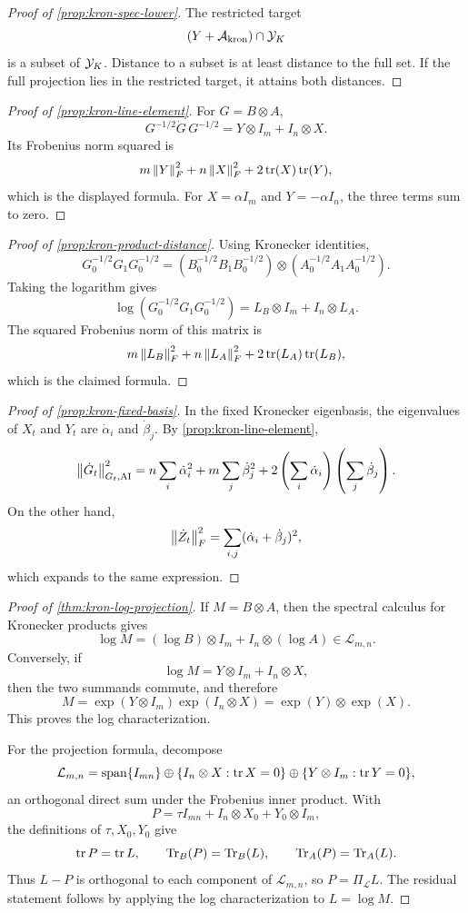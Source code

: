 \begin{proof}[Proof of \cref{prop:kron-spec-lower}]
The restricted target
\[
  (Y+\mathcal A_{\mathrm{kron}})\cap\mathcal Y_K
\]
is a subset of \(\mathcal Y_K\). Distance to a subset is at least distance to the full
set. If the full projection lies in the restricted target, it attains both
distances.
\end{proof}

\begin{proof}[Proof of \cref{prop:kron-line-element}]
For \(G=B\otimes A\),
\[
  G^{-1/2}\dot G\,G^{-1/2}
  =
  Y\otimes I_m+I_n\otimes X.
\]
Its Frobenius norm squared is
\[
  m\left\lVert Y\right\rVert_F^2+n\left\lVert X\right\rVert_F^2+2\operatorname{tr}(X)\operatorname{tr}(Y),
\]
which is the displayed formula. For \(X=\alpha I_m\) and \(Y=-\alpha I_n\), the
three terms sum to zero.
\end{proof}

\begin{proof}[Proof of \cref{prop:kron-product-distance}]
Using Kronecker identities,
\[
  G_0^{-1/2}G_1G_0^{-1/2}
  =
  (B_0^{-1/2}B_1B_0^{-1/2})
  \otimes
  (A_0^{-1/2}A_1A_0^{-1/2}).
\]
Taking the logarithm gives
\[
  \log(G_0^{-1/2}G_1G_0^{-1/2})
  =
  L_B\otimes I_m+I_n\otimes L_A.
\]
The squared Frobenius norm of this matrix is
\[
  m\left\lVert L_B\right\rVert_F^2+n\left\lVert L_A\right\rVert_F^2+2\operatorname{tr}(L_A)\operatorname{tr}(L_B),
\]
which is the claimed formula.
\end{proof}

\begin{proof}[Proof of \cref{prop:kron-fixed-basis}]
In the fixed Kronecker eigenbasis, the eigenvalues of \(X_t\) and \(Y_t\) are
\(\dot\alpha_i\) and \(\dot\beta_j\). By \cref{prop:kron-line-element},
\[
  \left\lVert \dot G_t\right\rVert_{G_t,\mathrm{AI}}^2
  =
  n\sum_i\dot\alpha_i^2+
  m\sum_j\dot\beta_j^2+
  2\left(\sum_i\dot\alpha_i\right)\left(\sum_j\dot\beta_j\right).
\]
On the other hand,
\[
  \left\lVert \dot Z_t\right\rVert_F^2
  =
  \sum_{i,j}(\dot\alpha_i+\dot\beta_j)^2,
\]
which expands to the same expression.
\end{proof}

\begin{proof}[Proof of \cref{thm:kron-log-projection}]
If \(M=B\otimes A\), then the spectral calculus for Kronecker products gives
\[
  \log M=(\log B)\otimes I_m+I_n\otimes(\log A)\in\mathcal L_{m,n}.
\]
Conversely, if
\[
  \log M=Y\otimes I_m+I_n\otimes X,
\]
then the two summands commute, and therefore
\[
  M=\exp(Y\otimes I_m)\exp(I_n\otimes X)=\exp(Y)\otimes\exp(X).
\]
This proves the log characterization.

For the projection formula, decompose
\[
  \mathcal L_{m,n}
  =
  \operatorname{span}\{I_{mn}\}
  \oplus
  \{I_n\otimes X:\operatorname{tr} X=0\}
  \oplus
  \{Y\otimes I_m:\operatorname{tr} Y=0\},
\]
an orthogonal direct sum under the Frobenius inner product. With
\[
  P=\tau I_{mn}+I_n\otimes X_0+Y_0\otimes I_m,
\]
the definitions of \(\tau,X_0,Y_0\) give
\[
  \operatorname{tr} P=\operatorname{tr} L,\qquad
  \operatorname{Tr}_B(P)=\operatorname{Tr}_B(L),\qquad
  \operatorname{Tr}_A(P)=\operatorname{Tr}_A(L).
\]
Thus \(L-P\) is orthogonal to each component of \(\mathcal L_{m,n}\), so
\(P=\Pi_{\mathcal L}L\). The residual statement follows by applying the log
characterization to \(L=\log M\).
\end{proof}

